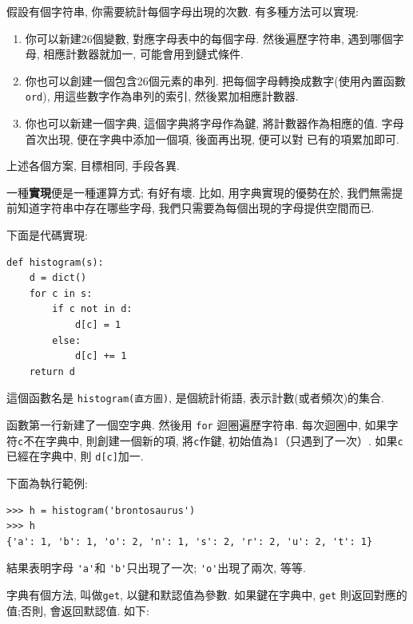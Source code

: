 \documentclass[10pt]{book}
\begin{document}
假設有個字符串, 你需要統計每個字母出現的次數. 
有多種方法可以實現:

\begin{enumerate}

\item 你可以新建26個變數, 對應字母表中的每個字母. 
然後遍歷字符串, 遇到哪個字母, 相應計數器就加一, 
可能會用到鏈式條件. 

\item 你也可以創建一個包含26個元素的串列. 
把每個字母轉換成數字(使用內置函數{\tt ord}), 用這些數字作為串列的索引, 
然後累加相應計數器. 

\item 你也可以新建一個字典, 這個字典將字母作為鍵, 
將計數器作為相應的值. 
字母首次出現, 便在字典中添加一個項, 後面再出現, 便可以對
已有的項累加即可. 

\end{enumerate}

上述各個方案, 目標相同, 手段各異.

一種{\bf 實現}便是一種運算方式; 有好有壞. 
比如, 用字典實現的優勢在於, 我們無需提前知道字符串中存在哪些字母, 
我們只需要為每個出現的字母提供空間而已. 

下面是代碼實現:

\begin{verbatim}
def histogram(s):
    d = dict()
    for c in s:
        if c not in d:
            d[c] = 1
        else:
            d[c] += 1
    return d
\end{verbatim}
%
這個函數名是 {\tt histogram(直方圖)}, 是個統計術語, 表示計數(或者頻次)的集合.

函數第一行新建了一個空字典. 
然後用 {\tt for} 迴圈遍歷字符串. 每次迴圈中, 如果字符{\tt c}不在字典中, 
則創建一個新的項, 將{\tt c}作鍵, 初始值為1（只遇到了一次）. 
如果{\tt c} 已經在字典中, 則 {\tt d[c]}加一.

下面為執行範例:

\begin{verbatim}
>>> h = histogram('brontosaurus')
>>> h
{'a': 1, 'b': 1, 'o': 2, 'n': 1, 's': 2, 'r': 2, 'u': 2, 't': 1}
\end{verbatim}
%

結果表明字母 \verb"'a'"和 \verb"'b'"只出現了一次;
\verb"'o'"出現了兩次, 等等. 


字典有個方法, 叫做{\tt get}, 
以鍵和默認值為參數. 
如果鍵在字典中, {\tt get} 則返回對應的值;否則, 會返回默認值. 
如下:
\end{document}

